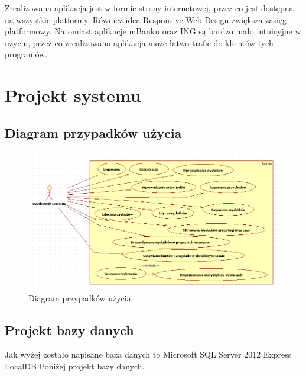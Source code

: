 \documentclass[10pt,titlepage]{article}
\begin{document}
\par Zrealizowana aplikacja jest w formie strony internetowej, przez co jest dostępna na wszystkie platformy. Również idea Responsive Web Design zwiększa zasięg platformowy. Natomiast aplikacje mBanku oraz ING są bardzo mało intuicyjne w użyciu, przez co zrealizowana aplikacja może łatwo trafić do klientów tych programów.
\section{Projekt systemu}
\subsection{Diagram przypadków użycia}
\begin{figure}[H]
  \centering
  \includegraphics[scale=0.7]{images/use_case.png}
  \caption{Diagram przypadków użycia}
\end{figure}
\subsection{Projekt bazy danych}
Jak wyżej zostało napisane baza danych to Microsoft SQL Server 2012 Express LocalDB
Poniżej projekt bazy danych.
\end{document}
